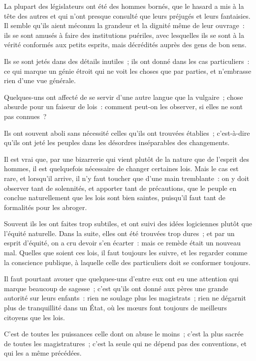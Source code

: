 \documentclass[french,twoside]{book} %
\begin{document}
\noindent La plupart des législateurs ont été des hommes bornés, que le hasard a mis à la tête des autres et qui n’ont presque consulté que leurs préjugés et leurs fantaisies. \\
Il semble qu’ils aient méconnu la grandeur et la dignité même de leur ouvrage : ils se sont amusés à faire des institutions puériles, avec lesquelles ils se sont à la vérité conformés aux petits esprits, mais décrédités auprès des gens de bon sens.\par
Ils se sont jetés dans des détails inutiles ; ils ont donné dans les cas particuliers : ce qui marque un génie étroit qui ne voit les choses que par parties, et n’embrasse rien d’une vue générale.\par
Quelques-uns ont affecté de se servir d’une autre langue que la vulgaire ; chose absurde pour un faiseur de lois : comment peut-on les observer, si elles ne sont pas connues ?\par
Ils ont souvent aboli sans nécessité celles qu’ils ont trouvées établies ; c’est-à-dire qu’ils ont jeté les peuples dans les désordres inséparables des changements.\par
Il est vrai que, par une bizarrerie qui vient plutôt de la nature que de l’esprit des hommes, il est quelquefois nécessaire de changer certaines lois. Mais le cas est rare, et lorsqu’il arrive, il n’y faut toucher que d’une main tremblante : on y doit observer tant de solennités, et apporter tant de précautions, que le peuple en conclue naturellement que les lois sont bien saintes, puisqu’il faut tant de formalités pour les abroger.\par
Souvent ils les ont faites trop subtiles, et ont suivi des idées logiciennes plutôt que l’équité naturelle. Dans la suite, elles ont été trouvées trop dures ; et par un esprit d’équité, on a cru devoir s’en écarter : mais ce remède était un nouveau mal. Quelles que soient ces lois, il faut toujours les suivre, et les regarder comme la conscience publique, à laquelle celle des particuliers doit se conformer toujours.\par
Il faut pourtant avouer que quelques-uns d’entre eux ont eu une attention qui marque beaucoup de sagesse ; c’est qu’ils ont donné aux pères une grande autorité sur leurs enfants : rien ne soulage plus les magistrats ; rien ne dégarnit plus de tranquillité dans un État, où les mœurs font toujours de meilleurs citoyens que les lois.\par
C’est de toutes les puissances celle dont on abuse le moins ; c’est la plus sacrée de toutes les magistratures ; c’est la seule qui ne dépend pas des conventions, et qui les a même précédées.\par
\end{document}
